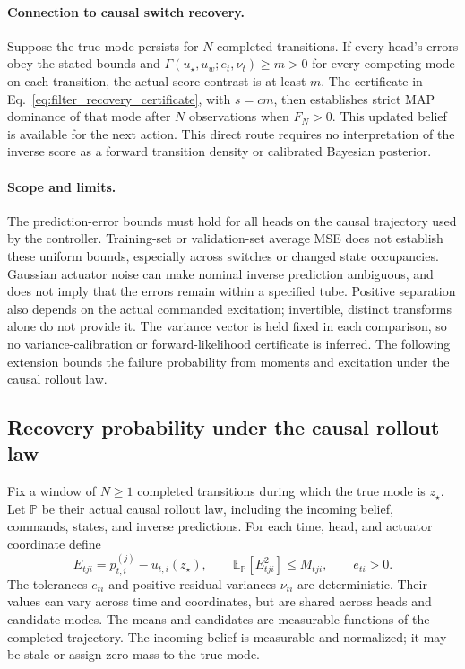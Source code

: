\paragraph{Connection to causal switch recovery.}
Suppose the true mode persists for $N$ completed transitions.
If every head's errors obey the stated bounds and $\Gamma(u_\star,u_w;e_t,\nu_t)\ge m>0$ for every competing mode on each transition,
the actual score contrast is at least $m$.
The certificate in Eq.~\eqref{eq:filter_recovery_certificate}, with $s=cm$, then establishes strict MAP dominance of that mode after $N$ observations when $F_N>0$.
This updated belief is available for the next action.
This direct route requires no interpretation of the inverse score as a forward transition density or calibrated Bayesian posterior.

\paragraph{Scope and limits.}
The prediction-error bounds must hold for all heads on the causal trajectory used by the controller.
Training-set or validation-set average MSE does not establish these uniform bounds, especially across switches or changed state occupancies.
Gaussian actuator noise can make nominal inverse prediction ambiguous, and does not imply that the errors remain within a specified tube.
Positive separation also depends on the actual commanded excitation; invertible, distinct transforms alone do not provide it.
The variance vector is held fixed in each comparison, so no variance-calibration or forward-likelihood certificate is inferred.
The following extension bounds the failure probability from moments and excitation under the causal rollout law.

\subsection{Recovery probability under the causal rollout law}
\label{app:recovery_probability}

Fix a window of $N\ge1$ completed transitions during which the true mode is $z_\star$.
Let $\mathbb P$ be their actual causal rollout law, including the incoming belief, commands, states, and inverse predictions.
For each time, head, and actuator coordinate define
\begin{equation}
 E_{tji}=p_{t,i}^{(j)}-u_{t,i}(z_\star),\qquad
 \mathbb E_{\mathbb P}[E_{tji}^2]\le M_{tji},\qquad e_{ti}>0.
 \label{eq:causal_inverse_moment}
\end{equation}
The tolerances $e_{ti}$ and positive residual variances $\nu_{ti}$ are deterministic.
Their values can vary across time and coordinates, but are shared across heads and candidate modes.
The means and candidates are measurable functions of the completed trajectory.
The incoming belief is measurable and normalized; it may be stale or assign zero mass to the true mode.

